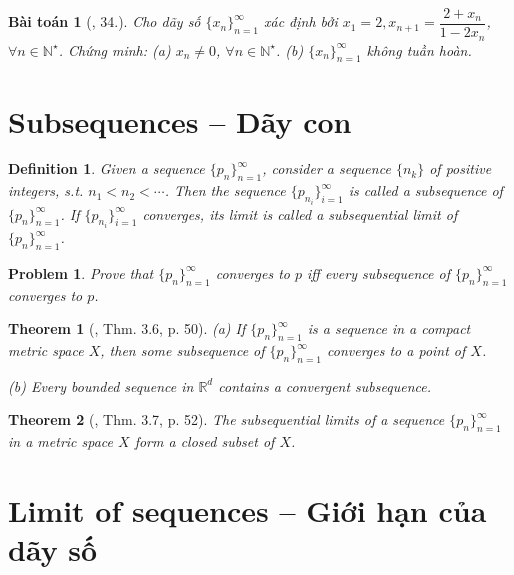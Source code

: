 \documentclass[oneside]{book}
\newtheorem{baitoan}{Bài toán}
\newtheorem{definition}{Definition}
\newtheorem{problem}{Problem}
\newtheorem{theorem}{Theorem}
\begin{document}
\begin{baitoan}[\cite{TLCT_dai_so_giai_tich_11}, 34.]
	Cho dãy số $\{x_n\}_{n=1}^\infty$ xác định bởi $x_1 = 2,x_{n+1} = \dfrac{2 + x_n}{1 - 2x_n}$, $\forall n\in\mathbb{N}^\star$. Chứng minh: (a) $x_n\ne0$, $\forall n\in\mathbb{N}^\star$. (b) $\{x_n\}_{n=1}^\infty$ không tuần hoàn.
\end{baitoan}


\section{Subsequences -- Dãy con}

\begin{definition}
	Given a sequence $\{p_n\}_{n=1}^\infty$, consider a sequence $\{n_k\}$ of positive integers, s.t. $n_1 < n_2 < \cdots$. Then the sequence $\{p_{n_i}\}_{i=1}^\infty$ is called a {\rm subsequence} of $\{p_n\}_{n=1}^\infty$. If $\{p_{n_i}\}_{i=1}^\infty$ converges, its limit is called a {\rm subsequential limit} of $\{p_n\}_{n=1}^\infty$.
\end{definition}

\begin{problem}
	Prove that $\{p_n\}_{n=1}^\infty$ converges to $p$ iff every subsequence of $\{p_n\}_{n=1}^\infty$ converges to $p$.
\end{problem}

\begin{theorem}[\cite{Rudin1976}, Thm. 3.6, p. 50]
	\item(a) If $\{p_n\}_{n=1}^\infty$ is a sequence in a compact metric space $X$, then some subsequence of $\{p_n\}_{n=1}^\infty$ converges to a point of $X$.
	\item(b) Every bounded sequence in $\mathbb{R}^d$ contains a convergent subsequence.
\end{theorem}

\begin{theorem}[\cite{Rudin1976}, Thm. 3.7, p. 52]
	The subsequential limits of a sequence $\{p_n\}_{n=1}^\infty$ in a metric space $X$ form a closed subset of $X$.
\end{theorem}


\section{Limit of sequences -- Giới hạn của dãy số}
\end{document}
